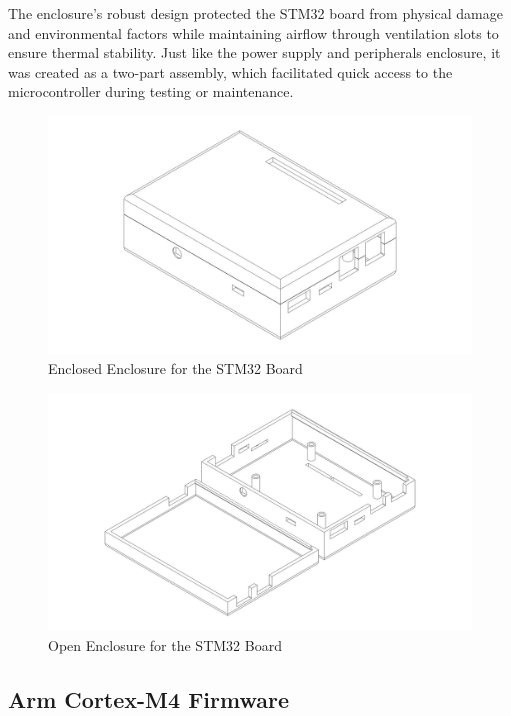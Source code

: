 \documentclass[12pt]{article}
\begin{document}
The enclosure's robust design protected the STM32 board from physical damage
and environmental factors while maintaining airflow through ventilation slots
to ensure thermal stability. Just like the power supply and peripherals
enclosure, it was created as a two-part assembly, which facilitated quick
access to the microcontroller during testing or maintenance.

\begin{figure}[H]
  \includegraphics[width=\textwidth]{../assets/pcb/image10.jpg}
  \caption{Enclosed Enclosure for the STM32 Board}
\end{figure}

\begin{figure}[H]
  \includegraphics[width=\textwidth]{../assets/pcb/image11.jpg}
  \caption{Open Enclosure for the STM32 Board}
\end{figure}


\subsection{Arm Cortex-M4 Firmware}
\end{document}
